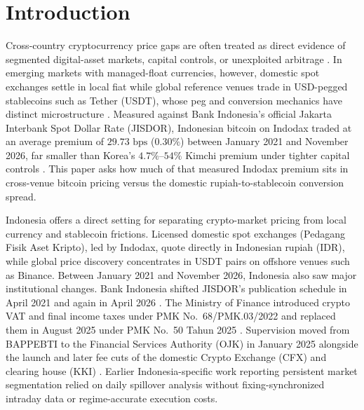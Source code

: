 \section{Introduction}
\label{sec:intro}

Cross-country cryptocurrency price gaps are often treated as direct evidence of segmented digital-asset markets, capital controls, or unexploited arbitrage \citep{pieters2017financial,choi2018kimchi,makarov2020trading,borri2020regulation,lee2022kimchi,grafvonluckner2023crypto,hautsch2024building}. In emerging markets with managed-float currencies, however, domestic spot exchanges settle in local fiat while global reference venues trade in USD-pegged stablecoins such as Tether (USDT), whose peg and conversion mechanics have distinct microstructure \citep{lyons2023stablecoins}. Measured against Bank Indonesia's official Jakarta Interbank Spot Dollar Rate (JISDOR), Indonesian bitcoin on Indodax traded at an average premium of $29.73\text{ bps}$ ($0.30\%$) between January 2021 and November 2026, far smaller than Korea's $4.7\%$--$54\%$ Kimchi premium under tighter capital controls \citep{choi2018kimchi}. This paper asks how much of that measured Indodax premium sits in cross-venue bitcoin pricing versus the domestic rupiah-to-stablecoin conversion spread.

Indonesia offers a direct setting for separating crypto-market pricing from local currency and stablecoin frictions. Licensed domestic spot exchanges (Pedagang Fisik Aset Kripto), led by Indodax, quote directly in Indonesian rupiah (IDR), while global price discovery concentrates in USDT pairs on offshore venues such as Binance. Between January 2021 and November 2026, Indonesia also saw major institutional changes. Bank Indonesia shifted JISDOR's publication schedule in April 2021 and again in April 2026 \citep{bi_sp233021,bi_padg072026}. The Ministry of Finance introduced crypto VAT and final income taxes under PMK No.\ 68/PMK.03/2022 and replaced them in August 2025 under PMK No.\ 50 Tahun 2025 \citep{pmk68_2022,pmk50_2025}. Supervision moved from BAPPEBTI to the Financial Services Authority (OJK) in January 2025 \citep{pojk27_2024} alongside the launch and later fee cuts of the domestic Crypto Exchange (CFX) and clearing house (KKI) \citep{perba9_2024,cfx_seb001_2026}. Earlier Indonesia-specific work reporting persistent market segmentation \citep{maulana2026segmentasi} relied on daily spillover analysis without fixing-synchronized intraday data or regime-accurate execution costs.

